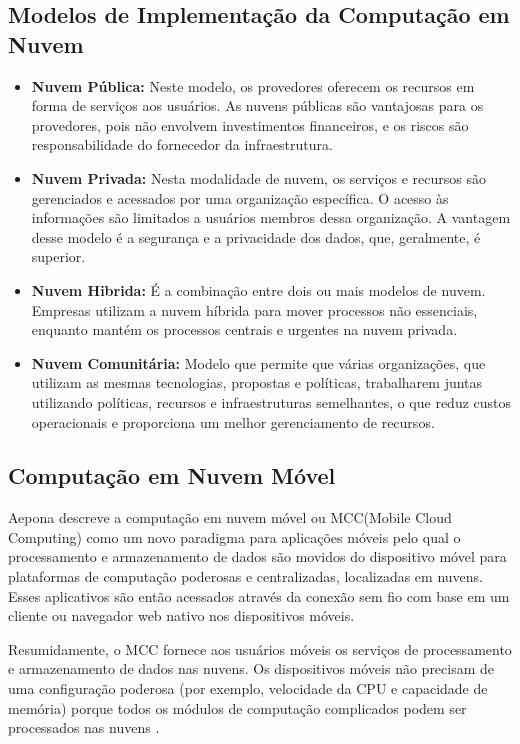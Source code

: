 \documentclass[12pt]{article}
\begin{document}
\subsection{Modelos de Implementação da Computação em Nuvem}

\begin{itemize}
  \item \textbf{Nuvem Pública:} Neste modelo, os provedores oferecem os recursos
  em forma de serviços aos usuários. As nuvens públicas são vantajosas para os provedores,
  pois não envolvem investimentos financeiros, e os riscos são responsabilidade do
  fornecedor da infraestrutura.
  \item \textbf{Nuvem Privada:} Nesta modalidade de nuvem, os serviços e recursos são
  gerenciados e acessados por uma organização específica. O acesso às informações
  são limitados a usuários membros dessa organização. A vantagem desse modelo é a segurança
  e a privacidade dos dados, que, geralmente, é superior.
  \item \textbf{Nuvem Hibrida:} É a combinação entre dois ou mais modelos de nuvem.
  Empresas utilizam a nuvem híbrida para mover processos não essenciais, enquanto mantém
  os processos centrais e urgentes na nuvem privada.
  \item \textbf{Nuvem Comunitária:} Modelo que permite que várias organizações, que
  utilizam as mesmas tecnologias, propostas e políticas, trabalharem juntas utilizando
  políticas, recursos e infraestruturas semelhantes, o que reduz custos operacionais e
  proporciona um melhor gerenciamento de recursos.
\end{itemize}

\subsection{Computação em Nuvem Móvel}

Aepona \cite{aepona2010} descreve a computação em nuvem móvel ou MCC(Mobile Cloud Computing) como um novo paradigma para aplicações
móveis pelo qual o processamento e armazenamento de dados são movidos do dispositivo móvel para plataformas de computação
poderosas e centralizadas, localizadas em nuvens. Esses aplicativos são então acessados através da conexão sem fio com base em
um cliente ou navegador web nativo nos dispositivos móveis.

Resumidamente, o MCC fornece aos usuários móveis os serviços de processamento e armazenamento de dados nas nuvens.
Os dispositivos móveis não precisam de uma configuração poderosa (por exemplo, velocidade da CPU e capacidade de memória)
porque todos os módulos de computação complicados podem ser processados nas nuvens \cite{liu2010}.
\end{document}
